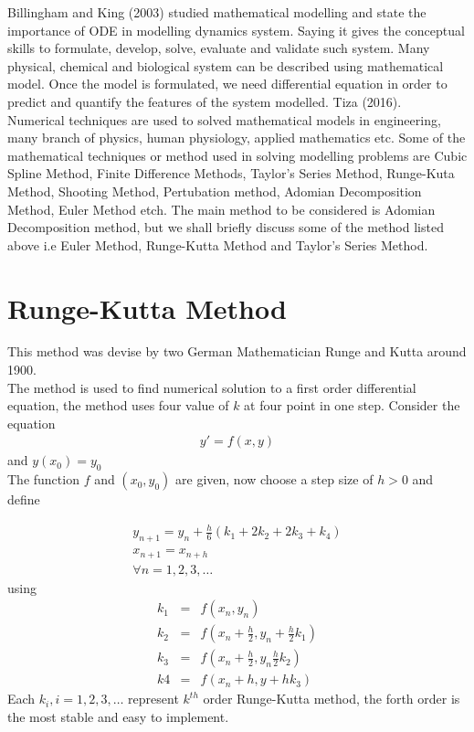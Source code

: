 \documentclass[11pt]{report}
\newcommand{\sps}{\\[0.2cm]}
\newcommand{\NI}{\noindent}
\newcommand{\sprime}{'}
\begin{document}
	\NI Billingham and King (2003) studied mathematical modelling and state the importance of ODE in modelling dynamics system. Saying it gives the conceptual skills to formulate, develop, solve, evaluate and validate such system. Many physical, chemical and biological system can be described using mathematical model. Once the model is formulated, we need differential equation in order to predict and quantify the features of the system modelled. Tiza (2016).\\
	
	\NI Numerical techniques are used to solved mathematical models in engineering, many branch of physics, human physiology, applied mathematics etc. Some of the mathematical techniques or method used in solving modelling problems are Cubic Spline Method, Finite Difference Methods, Taylor's Series Method, Runge-Kuta Method, Shooting Method, Pertubation method, Adomian Decomposition Method, Euler Method etch. The main method to be considered is Adomian Decomposition method, but we shall briefly discuss some of the method listed above i.e Euler Method, Runge-Kutta Method and Taylor's Series Method.
	
	\section{Runge-Kutta Method}
	This method was devise by two German Mathematician Runge and Kutta around 1900.\\
	The method is used to find numerical solution to a first order differential equation, the method uses four value of $k$ at four point in one step. Consider the equation
	\begin{eqnarray}
		y\sprime = f(x,y)
	\end{eqnarray}
	and $y(x_0)=y_0$\\
	The function $f$ and $(x_0,y_0)$ are given, now choose a step size of $h>0$ and define
	
	\begin{gather}
		y_{n+1} = y_n+\frac{h}{6}(k_1+2k_2+2k_3+k_4)\sps
		x_{n+1} = x_{n+h}\sps
		\forall n = 1,2,3,\ldots
	\end{gather}
	using 
	\begin{eqnarray}
		k_1 &=& f(x_n,y_n) \sps
		k_2 &=& f(x_n + \frac{h}{2}, y_n + \frac{h}{2}k_1)\sps
		k_3 &=& f(x_n+\frac{h}{2}, y_n \frac{h}{2}k_2)\sps
		k4 &=& f(x_n + h, y+hk_3) 
	\end{eqnarray}
	Each $k_i, i=1,2,3,\ldots$ represent $k^{th}$ order Runge-Kutta method, the forth order is the most stable and easy to implement.
	
\end{document}
